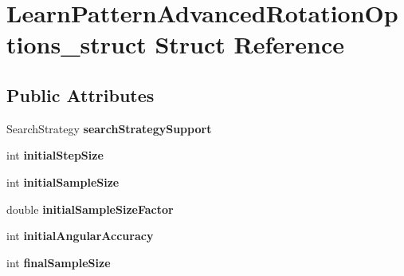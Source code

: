 \hypertarget{structLearnPatternAdvancedRotationOptions__struct}{\section{\-Learn\-Pattern\-Advanced\-Rotation\-Options\-\_\-struct \-Struct \-Reference}
\label{structLearnPatternAdvancedRotationOptions__struct}
}
\subsection*{\-Public \-Attributes}
\begin{DoxyCompactItemize}
\item 
\hypertarget{structLearnPatternAdvancedRotationOptions__struct_afd874253b21d0be147cccc613d47cf89}{\-Search\-Strategy {\bfseries search\-Strategy\-Support}}\label{structLearnPatternAdvancedRotationOptions__struct_afd874253b21d0be147cccc613d47cf89}

\item 
\hypertarget{structLearnPatternAdvancedRotationOptions__struct_ab39e73e12db3ed6d260c52c79d207e7c}{int {\bfseries initial\-Step\-Size}}\label{structLearnPatternAdvancedRotationOptions__struct_ab39e73e12db3ed6d260c52c79d207e7c}

\item 
\hypertarget{structLearnPatternAdvancedRotationOptions__struct_a8e4438e8195bc98b3c5f24a83d882e78}{int {\bfseries initial\-Sample\-Size}}\label{structLearnPatternAdvancedRotationOptions__struct_a8e4438e8195bc98b3c5f24a83d882e78}

\item 
\hypertarget{structLearnPatternAdvancedRotationOptions__struct_af84976d135a91e58fbc51a9d8fc3340e}{double {\bfseries initial\-Sample\-Size\-Factor}}\label{structLearnPatternAdvancedRotationOptions__struct_af84976d135a91e58fbc51a9d8fc3340e}

\item 
\hypertarget{structLearnPatternAdvancedRotationOptions__struct_a0b25d4746bd7c156c26968af39a15050}{int {\bfseries initial\-Angular\-Accuracy}}\label{structLearnPatternAdvancedRotationOptions__struct_a0b25d4746bd7c156c26968af39a15050}

\item 
\hypertarget{structLearnPatternAdvancedRotationOptions__struct_a34f8332c317465175ef2b4abf4e59d98}{int {\bfseries final\-Sample\-Size}}\label{structLearnPatternAdvancedRotationOptions__struct_a34f8332c317465175ef2b4abf4e59d98}


\end{DoxyCompactItemize}
